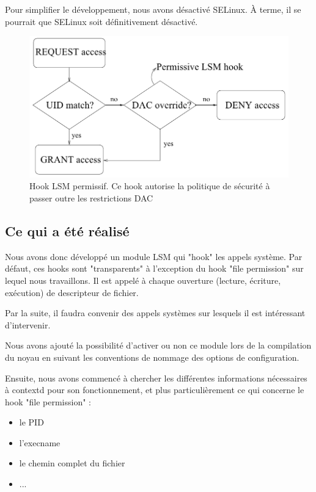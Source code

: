 \documentclass[pdftex,a4paper,titlepage,11pt,openright]{article}
\begin{document}
Pour simplifier le développement, nous avons désactivé SELinux. \`A terme, il se pourrait que SELinux soit définitivement désactivé.

\begin{figure}%
	\centering
	\includegraphics[scale=0.45]{lsm2.png}
	\caption{Hook LSM permissif. Ce hook autorise la politique de sécurité à passer outre les restrictions DAC \cite{LSMINTRO}}
\end{figure}

\newpage

\subsection{Ce qui a été réalisé}

Nous avons donc développé un module LSM qui "hook" les appels système. Par défaut, ces hooks sont "transparents" à l'exception du hook "file permission" sur lequel nous travaillons. Il est appelé à chaque ouverture (lecture, écriture, exécution) de descripteur de fichier.

Par la suite, il faudra convenir des appels systèmes sur lesquels il est intéressant d'intervenir.

Nous avons ajouté la possibilité d'activer ou non ce module lors de la compilation du noyau en suivant les conventions de nommage des options de configuration.

Ensuite, nous avons commencé à chercher les différentes informations nécessaires à contextd pour son fonctionnement, et plus particulièrement ce qui concerne le hook "file permission" :
	\begin{itemize}
		\item le PID
		\item l'execname
		\item le chemin complet du fichier
		\item ...
	\end{itemize}
\end{document}
